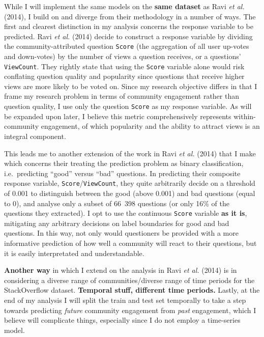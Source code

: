 \documentclass[11pt,preprint, authoryear]{article}
\numberwithin{equation}{section}
\begin{document}
While I will implement the same models on the \textbf{same dataset} as
Ravi \emph{et al.} (2014), I build on and diverge from their methodology
in a number of ways. The first and clearest distinction in my analysis
concerns the response variable to be predicted. Ravi \emph{et al.}
(2014) decide to construct a response variable by dividing the
community-attributed question \texttt{Score} (the aggregation of all
user up-votes and down-votes) by the number of views a question
receives, or a questions' \texttt{ViewCount}. They rightly state that
using the \texttt{Score} variable alone would risk conflating question
quality and popularity since questions that receive higher views are
more likely to be voted on. Since my research objective differs in that
I frame my research problem in terms of community engagement rather than
question quality, I use only the question \texttt{Score} as my response
variable. As will be expanded upon later, I believe this metric
comprehensively represents within-community engagement, of which
popularity and the ability to attract views is an integral component.

This leads me to another extension of the work in Ravi \emph{et al.}
(2014) that I make which concerns their treating the prediction problem
as binary classification, i.e.~predicting ``good'' versus ``bad''
questions. In predicting their composite response variable,
\texttt{Score}/\texttt{ViewCount}, they quite arbitrarily decide on a
threshold of 0.001 to distinguish between the good (above 0.001) and bad
questions (equal to 0), and analyse only a subset of 66~398 questions
(or only 16\% of the questions they extracted). I opt to use the
continuous \texttt{Score} variable \textbf{as it is}, mitigating any
arbitrary decisions on label boundaries for good and bad questions. In
this way, not only would questioners be provided with a more informative
prediction of how well a community will react to their questions, but it
is easily interpretated and understandable.

\textbf{Another way} in which I extend on the analysis in Ravi \emph{et
al.} (2014) is in considering a diverse range of communities/diverse
range of time periods for the StackOverflow dataset. \textbf{Temporal
stuff, different time periods.} Lastly, at the end of my analysis I will
split the train and test set temporally to take a step towards
predicting \emph{future} community engagement from \emph{past}
engagement, which I believe will complicate things, especially since I
do not employ a time-series model.
\end{document}
